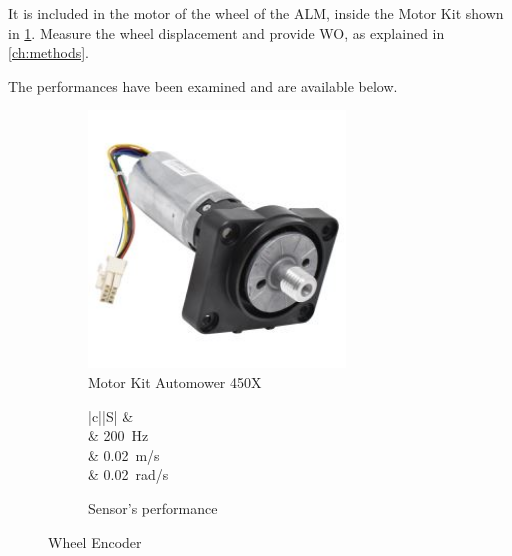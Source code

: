\noindent
It is included in the motor of the wheel of the \gls{ALM}, inside the Motor Kit shown in \ref{fig:wheelenc}.
Measure the wheel displacement and provide \gls{WO}, as explained in \ref{ch:methods}.


The performances have been examined and are available below.

\begin{figure}[!ht]
	\begin{center}
		\begin{subfigure}[b]{.5\textwidth}
			\centering
			\includegraphics[width=0.75\textwidth]{Images/4-Methods/MotorEnc.jpeg}
			\caption{Motor Kit Automower 450X }
			\label{fig:wheelenc}
		\end{subfigure}%
		\begin{subfigure}[b]{.45\textwidth}
			\begin{center}
				\label{tab:evalWheels}
				\begin{tabular}{|c||S|}
					\hline
					 &   \\
					\hline
					\hline
					 &  \SI{200}{Hz} \\
					\hline
					 &  \SI{0.02}{\meter/\second} \\
					\hline
					\centering{$\boldsymbol \eta_{\omega}$} & \SI{0.02}{\radian/\second} \\
					\hline
				\end{tabular}
				\caption{Sensor's performance}
			\end{center}
		\end{subfigure}
		\caption{Wheel Encoder }
		\label{fig:wheel}
	\end{center}
\end{figure}

